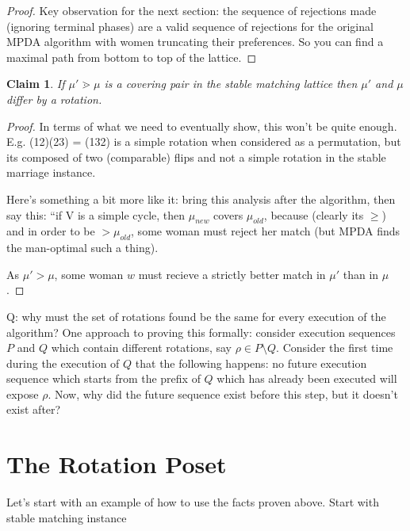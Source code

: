 \documentclass[12pt]{article}
\newtheorem{claim}[definition]{Claim}
\begin{document}
  \begin{proof}

    Key observation for the next section: the sequence of rejections made
    (ignoring terminal phases) are a valid sequence of rejections for the
    original MPDA algorithm with women truncating their preferences.
    So you can find a maximal path from bottom to top of the lattice.
  \end{proof}
  \begin{claim}
    If $\mu' \gtrdot \mu$ is a covering pair in the stable matching lattice
    then $\mu'$ and $\mu$ differ by a rotation.
  \end{claim}
  \begin{proof}
    In terms of what we need to eventually show, this won't be quite enough.
    E.g. (12)(23) = (132) is a simple rotation when considered as a permutation,
    but its composed of two (comparable) flips and not a simple rotation in the
    stable marriage instance.

    Here's something a bit more like it: bring this analysis after the
    algorithm, then say this: ``if V is a simple cycle, then $\mu_{new}$
    covers $\mu_{old}$, because (clearly its $\ge$) and in order to be
    $>\mu_{old}$, some woman must reject her match (but MPDA finds the
    man-optimal such a thing).

    As $\mu' > \mu$, some woman $w$ must recieve a strictly better match in
    $\mu'$ than in $\mu$.
  \end{proof}

  Q: why must the set of rotations found be the same for every execution of the
  algorithm? One approach to proving this formally: consider execution sequences
  $P$ and $Q$ which contain different rotations, say $\rho\in P\setminus Q$.
  Consider the first time during the execution of $Q$ that the following
  happens: no future execution sequence which starts from the prefix of $Q$
  which has already been executed will expose $\rho$.
  Now, why did the future sequence exist before this step, but it doesn't exist
  after?

\section{The Rotation Poset}

  Let's start with an example of how to use the facts proven above.
  Start with stable matching instance
\end{document}
